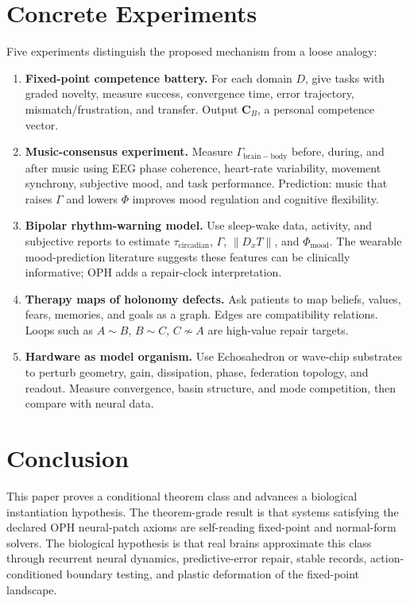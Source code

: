 \documentclass[11pt]{article}
\theoremstyle{remark}
\theoremstyle{plain}
\begin{document}
\section{Concrete Experiments}

Five experiments distinguish the proposed mechanism from a loose analogy:
\begin{enumerate}
\item \textbf{Fixed-point competence battery.} For each domain \(D\), give tasks with graded novelty, measure success, convergence time, error trajectory, mismatch/frustration, and transfer. Output \(\mathbf C_B\), a personal competence vector.
\item \textbf{Music-consensus experiment.} Measure \(\Gamma_{\mathrm{brain-body}}\) before, during, and after music using EEG phase coherence, heart-rate variability, movement synchrony, subjective mood, and task performance. Prediction: music that raises \(\Gamma\) and lowers \(\Phi\) improves mood regulation and cognitive flexibility.
\item \textbf{Bipolar rhythm-warning model.} Use sleep-wake data, activity, and subjective reports to estimate \(\tau_{\mathrm{circadian}}\), \(\Gamma\), \(\|D_xT\|\), and \(\Phi_{\mathrm{mood}}\). The wearable mood-prediction literature suggests these features can be clinically informative; OPH adds a repair-clock interpretation.
\item \textbf{Therapy maps of holonomy defects.} Ask patients to map beliefs, values, fears, memories, and goals as a graph. Edges are compatibility relations. Loops such as \(A\sim B\), \(B\sim C\), \(C\not\sim A\) are high-value repair targets.
\item \textbf{Hardware as model organism.} Use Echosahedron or wave-chip substrates to perturb geometry, gain, dissipation, phase, federation topology, and readout. Measure convergence, basin structure, and mode competition, then compare with neural data.
\end{enumerate}

\section{Conclusion}

This paper proves a conditional theorem class and advances a biological instantiation hypothesis. The theorem-grade result is that systems satisfying the declared OPH neural-patch axioms are self-reading fixed-point and normal-form solvers. The biological hypothesis is that real brains approximate this class through recurrent neural dynamics, predictive-error repair, stable records, action-conditioned boundary testing, and plastic deformation of the fixed-point landscape.
\end{document}
